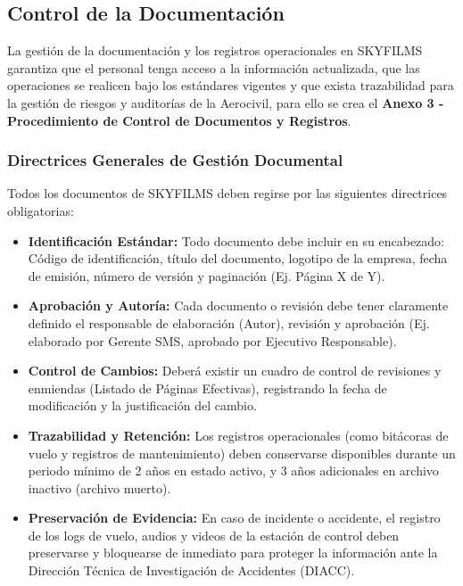 \subsection{Control de la Documentación}
La gestión de la documentación y los registros operacionales en SKYFILMS garantiza que el personal tenga acceso a la información actualizada, que las operaciones se realicen bajo los estándares vigentes y que exista trazabilidad para la gestión de riesgos y auditorías de la Aerocivil, para ello se crea el \textbf{Anexo 3 - Procedimiento de Control de Documentos y Registros}.

\subsubsection{Directrices Generales de Gestión Documental}
Todos los documentos de SKYFILMS deben regirse por las siguientes directrices obligatorias:

\begin{itemize}
    \item \textbf{Identificación Estándar:} Todo documento debe incluir en su encabezado: Código de identificación, título del documento, logotipo de la empresa, fecha de emisión, número de versión y paginación (Ej. Página X de Y).
    
    \item \textbf{Aprobación y Autoría:} Cada documento o revisión debe tener claramente definido el responsable de elaboración (Autor), revisión y aprobación (Ej. elaborado por Gerente SMS, aprobado por Ejecutivo Responsable).
    
    \item \textbf{Control de Cambios:} Deberá existir un cuadro de control de revisiones y enmiendas (Listado de Páginas Efectivas), registrando la fecha de modificación y la justificación del cambio.
    
    \item \textbf{Trazabilidad y Retención:} Los registros operacionales (como bitácoras de vuelo y registros de mantenimiento) deben conservarse disponibles durante un periodo mínimo de 2 años en estado activo, y 3 años adicionales en archivo inactivo (archivo muerto).

    \item \textbf{Preservación de Evidencia:} En caso de incidente o accidente, el registro de los logs de vuelo, audios y videos de la estación de control deben preservarse y bloquearse de inmediato para proteger la información ante la Dirección Técnica de Investigación de Accidentes (DIACC).
\end{itemize}

